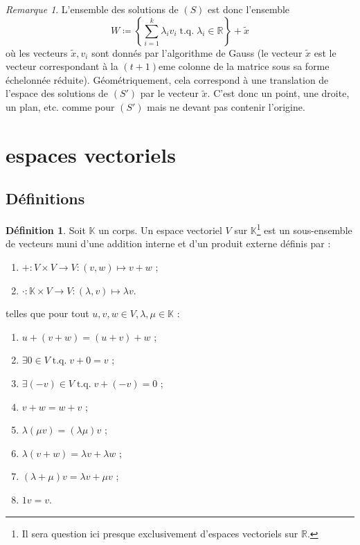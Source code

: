 \documentclass{article}
\DeclareMathOperator{\tq}{\text{ t.q. }}
\newcommand{\R}{\mathbb R}
\theoremstyle{definition}
\newtheorem{déf}[thm]{Définition}
\theoremstyle{remark}
\newtheorem*{rmq}{Remarque}
\begin{document}
		\begin{rmq} L'ensemble des solutions de $(S)$ est donc l'ensemble \[W \coloneqq \left\{\sum_{i=1}^k\lambda_iv_i \tq \lambda_i \in \R\right\} + \widetilde x\] où
		les vecteurs $\widetilde x, v_i$ sont donnés par l'algorithme de Gauss (le vecteur $\widetilde x$ est le vecteur correspondant à la $(t+1)$eme colonne de la matrice
		sous sa forme échelonnée réduite). Géométriquement, cela correspond à une translation de l'espace des solutions de $(S')$ par le vecteur $\widetilde x$. C'est donc
		un point, une droite, un plan, etc. comme pour $(S')$ mais ne devant pas contenir l'origine. \end{rmq}
	
\section{espaces vectoriels}
	\subsection{Définitions}
		\begin{déf} Soit $\mathbb K$ un corps. Un espace vectoriel $V$ sur $\mathbb K$\footnote{Il sera question ici presque exclusivement d'espaces vectoriels sur $\R$.}
		est un sous-ensemble de vecteurs muni d'une addition interne et d'un produit externe définis par :
		\begin{enumerate}
			\item $+ : V \times V \to V : (v, w) \mapsto v+w$ ;
			\item $\cdot : \mathbb K \times V \to V : (\lambda, v) \mapsto \lambda v$.
		\end{enumerate}
		telles que pour tout $u, v, w \in V, \lambda, \mu \in \mathbb K$ :
		\begin{enumerate}
			\item $u + (v + w) = (u + v) + w$ ;
			\item $\exists 0 \in V \tq v + 0 = v$ ;
			\item $\exists (-v) \in V \tq v + (-v) = 0$ ;
			\item $v + w = w + v$ ;
			\item $\lambda(\mu v) = (\lambda\mu)v$ ;
			\item $\lambda (v+w) = \lambda v + \lambda w$ ;
			\item $(\lambda + \mu)v = \lambda v + \mu v$ ;
			\item $1v = v$.
		\end{enumerate}
		\end{déf}
\end{document}
